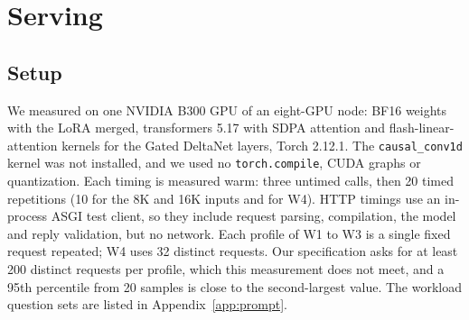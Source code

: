 \section{Serving}
\label{sec:serving}

\subsection{Setup}

We measured \expone{} on one NVIDIA B300 GPU of an eight-GPU node: BF16
weights with the LoRA merged, transformers 5.17 with SDPA attention and flash-linear-attention
kernels for the Gated DeltaNet layers, Torch 2.12.1. The \texttt{causal\_conv1d} kernel was
not installed, and we used no \texttt{torch.compile}, CUDA graphs or quantization. Each
timing is measured warm: three untimed calls, then 20 timed repetitions (10 for the 8K and
16K inputs and for W4). HTTP timings use an in-process ASGI test client, so they include
request parsing, compilation, the model and reply validation, but no network. Each profile
of W1 to W3 is a single fixed request repeated; W4 uses 32 distinct requests. Our
specification asks for at least 200 distinct requests per profile, which this measurement
does not meet, and a 95th percentile from 20 samples is close to the second-largest value.
The workload question sets are listed in Appendix~\ref{app:prompt}.

